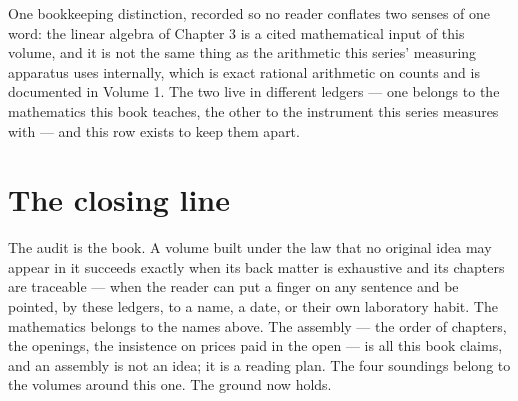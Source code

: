One bookkeeping distinction, recorded so no reader conflates two senses
of one word: the linear algebra of Chapter 3 is a cited mathematical
input of this volume, and it is not the same thing as the arithmetic
this series' measuring apparatus uses internally, which is exact
rational arithmetic on counts and is documented in Volume 1. The two
live in different ledgers --- one belongs to the mathematics this book
teaches, the other to the instrument this series measures with --- and
this row exists to keep them apart.

\section*{The closing line}

The audit is the book. A volume built under the law that no original
idea may appear in it succeeds exactly when its back matter is
exhaustive and its chapters are traceable --- when the reader can put a
finger on any sentence and be pointed, by these ledgers, to a name, a
date, or their own laboratory habit. The mathematics belongs to the
names above. The assembly --- the order of chapters, the openings, the
insistence on prices paid in the open --- is all this book claims, and
an assembly is not an idea; it is a reading plan. The four soundings
belong to the volumes around this one. The ground now holds.
